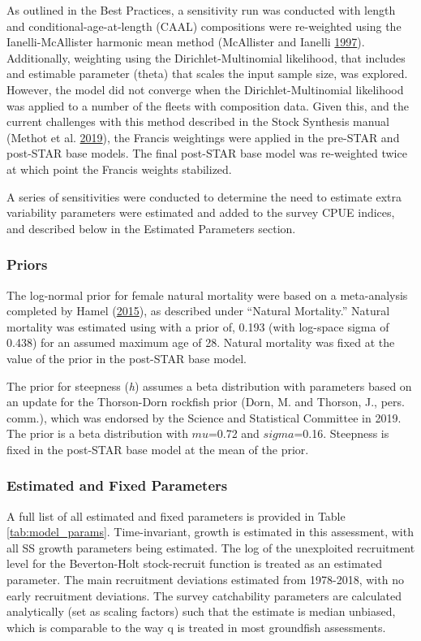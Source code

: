 \documentclass[12pt,]{article}
\begin{document}
As outlined in the Best Practices, a sensitivity run was conducted with
length and conditional-age-at-length (CAAL) compositions were
re-weighted using the Ianelli-McAllister harmonic mean method
(McAllister and Ianelli \protect\hyperlink{ref-McAllister1997}{1997}).
Additionally, weighting using the Dirichlet-Multinomial likelihood, that
includes and estimable parameter (theta) that scales the input sample
size, was explored. However, the model did not converge when the
Dirichlet-Multinomial likelihood was applied to a number of the fleets
with composition data. Given this, and the current challenges with this
method described in the Stock Synthesis manual (Methot et al.
\protect\hyperlink{ref-Methot2019}{2019}), the Francis weightings were
applied in the pre-STAR and post-STAR base models. The final post-STAR
base model was re-weighted twice at which point the Francis weights
stabilized.

A series of sensitivities were conducted to determine the need to
estimate extra variability parameters were estimated and added to the
survey CPUE indices, and described below in the Estimated Parameters
section.

\subsubsection{Priors}\label{priors}

The log-normal prior for female natural mortality were based on a
meta-analysis completed by Hamel
(\protect\hyperlink{ref-Hamel2015}{2015}), as described under ``Natural
Mortality.'' Natural mortality was estimated using with a prior of,
0.193 (with log-space sigma of 0.438) for an assumed maximum age of 28.
Natural mortality was fixed at the value of the prior in the post-STAR
base model.

The prior for steepness (\emph{h}) assumes a beta distribution with
parameters based on an update for the Thorson-Dorn rockfish prior (Dorn,
M. and Thorson, J., pers. comm.), which was endorsed by the Science and
Statistical Committee in 2019. The prior is a beta distribution with
\(mu\)=0.72 and \(sigma\)=0.16. Steepness is fixed in the post-STAR base
model at the mean of the prior.

\subsubsection{Estimated and Fixed
Parameters}\label{estimated-and-fixed-parameters}

A full list of all estimated and fixed parameters is provided in Table
\ref{tab:model_params}. Time-invariant, growth is estimated in this
assessment, with all SS growth parameters being estimated. The log of
the unexploited recruitment level for the Beverton-Holt stock-recruit
function is treated as an estimated parameter. The main recruitment
deviations estimated from 1978-2018, with no early recruitment
deviations. The survey catchability parameters are calculated
analytically (set as scaling factors) such that the estimate is median
unbiased, which is comparable to the way q is treated in most groundfish
assessments.
\end{document}

